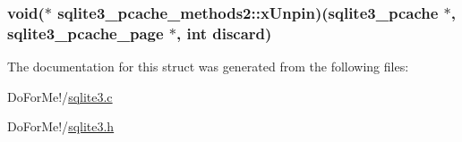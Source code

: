 \hypertarget{structsqlite3__pcache__methods2_ac94294551eda282f17b1ed2a110e1850}{
\subsubsection[{x\-Unpin}]{\setlength{\rightskip}{0pt plus 5cm}void($\ast$ sqlite3\-\_\-pcache\-\_\-methods2\-::x\-Unpin)({\bf sqlite3\-\_\-pcache} $\ast$, {\bf sqlite3\-\_\-pcache\-\_\-page} $\ast$, int discard)}}\label{structsqlite3__pcache__methods2_ac94294551eda282f17b1ed2a110e1850}


The documentation for this struct was generated from the following files\-:\begin{DoxyCompactItemize}
\item 
Do\-For\-Me!/\hyperlink{sqlite3_8c}{sqlite3.\-c}\item 
Do\-For\-Me!/\hyperlink{sqlite3_8h}{sqlite3.\-h}\end{DoxyCompactItemize}
